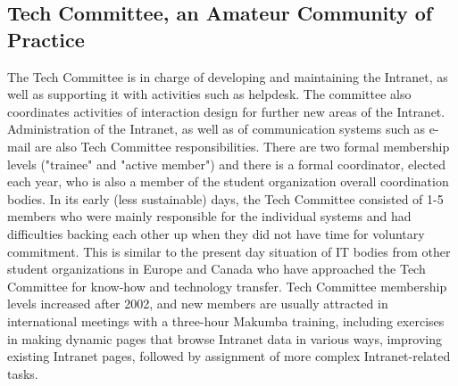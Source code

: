 \documentclass{llncs}
\begin{document}
\subsection{Tech Committee, an Amateur Community of Practice}\label{sec:techcomm}
The Tech Committee is in charge of developing and maintaining the Intranet, as well as supporting it with activities such as helpdesk. The committee also coordinates activities of interaction design for further new areas of the Intranet. Administration of the Intranet, as well as of communication systems such as e-mail are also Tech Committee responsibilities. There are two formal membership levels ("trainee" and "active member") and there is a formal coordinator, elected each year, who is also a member of the student organization overall coordination bodies. In its early (less sustainable) days, the Tech Committee consisted of 1-5 members who were mainly responsible for the individual systems and had difficulties backing each other up when they did not have time for voluntary commitment. This is similar to the present day situation of IT bodies from other student organizations in Europe and Canada who have approached the Tech Committee for know-how and technology transfer. Tech Committee membership levels increased after 2002, and new members are usually attracted in international meetings with a three-hour Makumba training, including exercises in making dynamic pages that browse Intranet data in various ways, improving existing Intranet pages, followed by assignment of more complex Intranet-related tasks.


\end{document}
